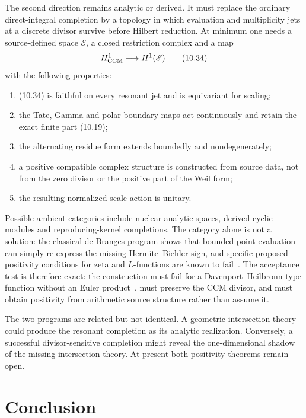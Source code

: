 \documentclass[11pt]{amsart}
\theoremstyle{definition}
\theoremstyle{remark}
\begin{document}
The second direction remains analytic or derived.  It must replace the
ordinary direct-integral completion by a topology in which evaluation and
multiplicity jets at a discrete divisor survive before Hilbert reduction.
At minimum one needs a source-defined space \(\mathscr E\), a closed
restriction complex and a map
\[
 H^1_{\rm CCM}\longrightarrow H^1(\mathscr E)
 \tag{10.34}
\]
with the following properties:
\begin{enumerate}
\item (10.34) is faithful on every resonant jet and is equivariant for
scaling;
\item the Tate, Gamma and polar boundary maps act continuously and retain
the exact finite part (10.19);
\item the alternating residue form extends boundedly and nondegenerately;
\item a positive compatible complex structure is constructed from source
data, not from the zero divisor or the positive part of the Weil form;
\item the resulting normalized scale action is unitary.
\end{enumerate}
Possible ambient categories include nuclear analytic spaces, derived
cyclic modules and reproducing-kernel completions.  The category alone is
not a solution: the classical de Branges program shows that bounded point
evaluation can simply re-express the missing Hermite--Biehler sign, and
specific proposed positivity conditions for zeta and \(L\)-functions are
known to fail~\cite{deBranges1968,ConreyLi2000}.  The acceptance test is
therefore exact: the construction must fail for a Davenport--Heilbronn
type function without an Euler product~\cite{DavenportHeilbronn1936}, must preserve the CCM divisor, and
must obtain positivity from arithmetic source structure rather than assume
it.

The two programs are related but not identical.  A geometric intersection
theory could produce the resonant completion as its analytic realization.
Conversely, a successful divisor-sensitive completion might reveal the
one-dimensional shadow of the missing intersection theory.  At present
both positivity theorems remain open.

\section{Conclusion}
\end{document}
